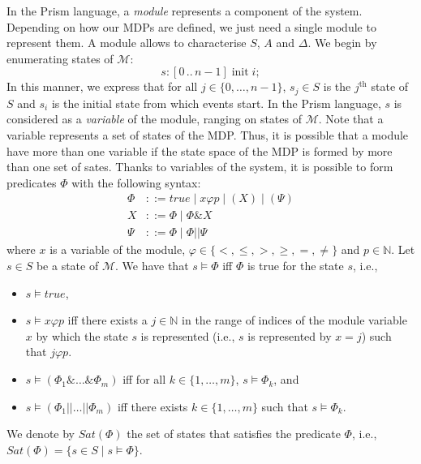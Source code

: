 In the Prism language, a \textit{module} represents a component of the system.
Depending on how our MDPs are defined, we just need a single module to
represent them. A module allows to characterise $S$, $A$ and $\Delta$. We begin by enumerating states of $\mathcal{M}$:
\[
  s: [0\, ..\, n-1] \; \text{init} \; i;
\]
In this manner, we express that for all $j \in \{0, \dots, n-1\}$, $s_j \in S$
is the $j^{\text{th}}$ state of $S$ and $s_i$ is the initial state from which events start. In the Prism language, $s$ is considered as a \textit{variable} of the module, ranging on states of $\mathcal{M}$. Note that a variable represents a set of states of the MDP. Thus, it is possible that a module have more than one variable if the state space of the MDP is formed by more than one set of sates.
Thanks to variables of the system, it is possible to form predicates $\Phi$ with the following  syntax:
\begin{align*}
  \Phi &::= true \; | \; x \varphi p \; | \; (X) \; | \; (\Psi) \\
  X &::= \Phi \; | \; \Phi \& X \\
  \Psi &::= \Phi \; | \; \Phi || \Psi
\end{align*}
where $x$ is a variable of the module, $\varphi \in \{<, \leq, >, \geq, =, \neq\}$
and $p \in \mathbb{N}$. Let $s \in S$ be a state of $\mathcal{M}$. We have that $s \models \Phi$ iff $\Phi$ is true for the state $s$, i.e.,
\begin{itemize}
  \item $s \models true$,
  \item $s \models x \varphi p$ iff there exists a $j \in \mathbb{N}$ in the range of indices of the module variable $x$ by which the state $s$ is represented (i.e., $s$ is represented by $x=j$) such that $j \varphi p$.
  \item $s \models (\Phi_1 \& \dots \& \Phi_m)$ iff
    for all $k \in \{1, \dots, m\}$, $s \models \Phi_k$, and
  \item $s \models (\Phi_1 || \dots || \Phi_m)$ iff
    there exists $k \in \{1, \dots, m\}$ such that $s \models \Phi_k$.
\end{itemize}
We denote by $Sat(\Phi)$ the set of states that satisfies the predicate $\Phi$, i.e., $Sat(\Phi) = \{s \in S \; | \; s \models \Phi\}$. \\

